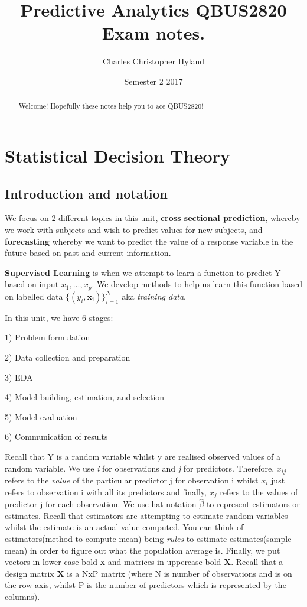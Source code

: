 \documentclass[11pt, oneside]{article}
\title{Predictive Analytics QBUS2820 Exam notes.}
\author{Charles Christopher Hyland}
\date{Semester 2 2017}
\def\dataset{\text{$\{(y_i, {\bm{x_i}})\}_{i=1}^N$}}
\theoremstyle{definition}
\begin{document}
\maketitle
\begin{abstract}
Welcome! Hopefully these notes help you to ace QBUS2820!
\end{abstract}
\newpage
\tableofcontents
\newpage
{}

\section{Statistical Decision Theory}
\subsection{Introduction and notation}
We focus on 2 different topics in this unit, \textbf{cross sectional prediction}, whereby we work with subjects and wish to predict values for new subjects, and \textbf{forecasting} whereby we want to predict the value of a response variable in the future based on past and current information.

\textbf{Supervised Learning} is when we attempt to learn a function to predict Y based on input $x_1,...,x_p$. We develop methods to help us learn this function based on labelled data $\dataset$ aka \textit{training data}.

In this unit, we have 6 stages:

1) Problem formulation

2) Data collection and preparation

3) EDA

4) Model building, estimation, and selection

5) Model evaluation

6) Communication of results

Recall that Y is a random variable whilst y are realised observed values of a random variable. We use \textit{i} for observations and \textit{j} for predictors. Therefore, $x_{ij}$ refers to the \textit{value} of the particular predictor j for observation i whilst $x_i$ just refers to observation i with all its predictors and finally, $x_j$ refers to the values of predictor j for each observation. We use hat notation $\hat{\beta}$ to represent estimators or estimates. Recall that estimators are attempting to estimate random variables whilst the estimate is an actual value computed. You can think of estimators(method to compute mean) being \textit{rules} to estimate estimates(sample mean) in order to figure out what the population average is. Finally, we put vectors in lower case bold \textbf{x} and matrices in uppercase bold \textbf{X}. Recall that a design matrix \textbf{X} is a NxP matrix (where N is number of observations and is on the row axis, whilst P is the number of predictors which is represented by the columns).
\end{document}
